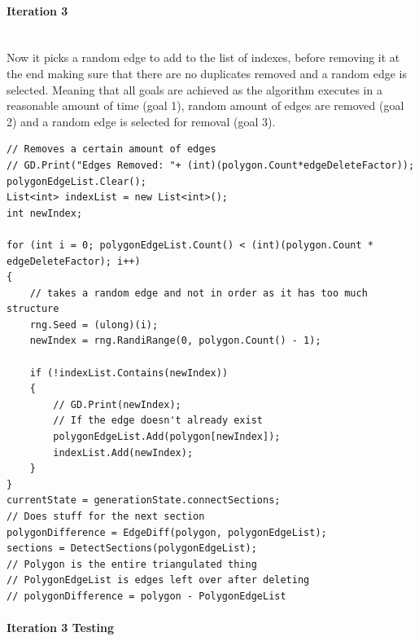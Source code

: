 \documentclass{article}
\newcommand{\myparagraph}[1]{\paragraph{#1}\mbox{}\\} %
\begin{document}
\myparagraph{Iteration 3}
Now it picks a random edge to add to the list of indexes, before removing it at the end making sure that there are no duplicates removed and a random edge is selected. Meaning that all goals are achieved as the algorithm executes in a reasonable amount of time (goal 1), random amount of edges are removed (goal 2) and a random edge is selected for removal (goal 3).
\begin{lstlisting}
// Removes a certain amount of edges
// GD.Print("Edges Removed: "+ (int)(polygon.Count*edgeDeleteFactor));
polygonEdgeList.Clear();
List<int> indexList = new List<int>();
int newIndex;

for (int i = 0; polygonEdgeList.Count() < (int)(polygon.Count * edgeDeleteFactor); i++)
{
    // takes a random edge and not in order as it has too much structure
    rng.Seed = (ulong)(i);
    newIndex = rng.RandiRange(0, polygon.Count() - 1);

    if (!indexList.Contains(newIndex))
    {
        // GD.Print(newIndex);
        // If the edge doesn't already exist
        polygonEdgeList.Add(polygon[newIndex]);
        indexList.Add(newIndex);
    }
}
currentState = generationState.connectSections;
// Does stuff for the next section
polygonDifference = EdgeDiff(polygon, polygonEdgeList);
sections = DetectSections(polygonEdgeList);
// Polygon is the entire triangulated thing
// PolygonEdgeList is edges left over after deleting
// polygonDifference = polygon - PolygonEdgeList
\end{lstlisting}

\myparagraph{Iteration 3 Testing}
\end{document}
